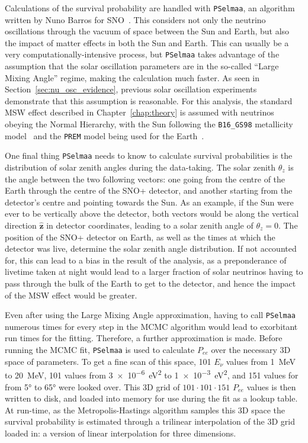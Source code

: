 Calculations of the survival probability are handled with \texttt{PSelmaa}, an algorithm written by Nuno Barros for SNO~\cite{barrosPrecisionMeasurementNeutrino2011}. %
This considers not only the neutrino oscillations through the vacuum of space between the Sun and Earth, but also the impact of matter effects in both the Sun and Earth. This can usually be a very computationally-intensive process, but \texttt{PSelmaa} takes advantage of the assumption that the solar oscillation parameters are in the so-called ``Large Mixing Angle'' regime, making the calculation much faster. As seen in Section~\ref{sec:nu_osc_evidence}, %
previous solar oscillation experiments demonstrate that this assumption is reasonable. For this analysis, the standard MSW effect described in Chapter~\ref{chap:theory} is assumed with neutrinos obeying the Normal Hierarchy, with the Sun following the \texttt{B16\_GS98} metallicity model~\cite{vinyolesB16StandardSolar2018} %
and the \texttt{PREM} model being used for the Earth~\cite{dziewonskiPreliminaryReferenceEarth1981}. %

One final thing \texttt{PSelmaa} needs to know to calculate survival probabilities is the distribution of solar zenith angles during the data-taking. The solar zenith $\theta_{z}$ is the angle between the two following vectors: one going from the centre of the Earth through the centre of the SNO+ detector, and another starting from the detector's centre and pointing towards the Sun. As an example, if the Sun were ever to be vertically above the detector, both vectors would be along the vertical direction $\bm{\hat{z}}$ in detector coordinates, leading to a solar zenith angle of $\theta_{z}=0$. The position of the SNO+ detector on Earth, as well as the times at which the detector was live, determine the solar zenith angle distribution. If not accounted for, this can lead to a bias in the result of the analysis, as a preponderance of livetime taken at night would lead to a larger fraction of solar neutrinos having to pass through the bulk of the Earth to get to the detector, and hence the impact of the MSW effect would be greater.

Even after using the Large Mixing Angle approximation, having to call \texttt{PSelmaa} numerous times for every step in the MCMC algorithm would lead to exorbitant run times for the fitting. Therefore, a further approximation is made. Before running the MCMC fit, \texttt{PSelmaa} is used to calculate $P_{ee}$ over the necessary 3D space of parameters. To get a fine scan of this space, 101 $E_{\nu}$ values from \SI{1}{\MeV} to \SI{20}{\MeV}, 101 \dmsq{} values from \SI{3e-6}{\eV\squared} to \SI{1e-3}{\eV\squared}, and 151 values for \tonetwo{} from \ang{5} to \ang{65} were looked over. This 3D grid of $101\cdot101\cdot151$ $P_{ee}$ values is then written to disk, and loaded into memory for use during the fit as a lookup table. At run-time, as the Metropolis-Hastings algorithm samples this 3D space the survival probability is estimated through a trilinear interpolation of the 3D grid loaded in: a version of linear interpolation for three dimensions.

